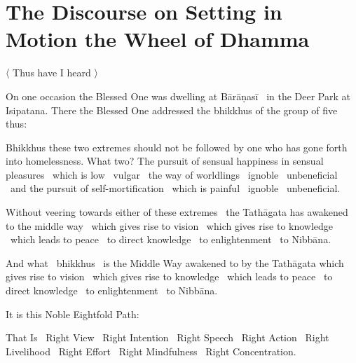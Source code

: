 \section{The Discourse on Setting in Motion the Wheel of Dhamma}
\label{wheel-of-dhamma-full}

\begin{leader-english}
  〈 Thus have I heard 〉
\end{leader-english}

\smallskip

\begin{english-hang}
  On one occasion the Blessed One was dwelling at Bārāṇasī \breathmark\ in the Deer Park at Isipatana. There the Blessed One addressed the bhikkhus of the group of five thus:
\end{english-hang}

\begin{english-hang}
Bhikkhus these two extremes should not be followed by one who has gone forth into homelessness. What two? The pursuit of sensual happiness in sensual pleasures \breathmark\ which is low \breathmark\ vulgar \breathmark\ the way of worldlings \breathmark\ ignoble \breathmark\ unbeneficial \breathmark\ and the pursuit of self-mortification \breathmark\ which is painful \breathmark\ ignoble \breathmark\ unbeneficial.
\end{english-hang}

\begin{english-hang}
Without veering towards either of these extremes \breathmark\ the Tathāgata has awakened to the middle way \breathmark\ which gives rise to vision \breathmark\ which gives rise to knowledge \breathmark\ which leads to peace \breathmark\ to direct knowledge \breathmark\ to enlightenment \breathmark\ to Nibbāna.
\end{english-hang}

\begin{english-hang}
And what \breathmark\ bhikkhus \breathmark\ is the Middle Way awakened to by the Tathāgata which gives rise to vision \breathmark\ which gives rise to knowledge \breathmark\ which leads to peace \breathmark\ to direct knowledge \breathmark\ to enlightenment \breathmark\ to Nibbāna.
\end{english-hang}

\begin{english-hang}
It is this Noble Eightfold Path:
\end{english-hang}

\begin{english-hang}
That Is \breathmark\ Right View \breathmark\ Right Intention \breathmark\ Right Speech \breathmark\ Right Action \breathmark\ Right Livelihood \breathmark\ Right Effort \breathmark\ Right Mindfulness \breathmark\ Right Concentration.
\end{english-hang}

